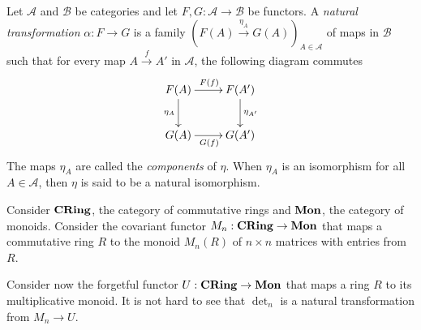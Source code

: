 \begin{definition}
    Let $\mathscr A$ and $\mathscr B$ be categories and let $F, G:\mathscr A\longrightarrow\mathscr B$ be functors. A \textit{natural transformation} $\alpha: F\to G$ is a family $\left(F(A)\stackrel{\eta_A}{\longrightarrow}G(A)\right)_{A\in\mathscr A}$ of maps in $\mathscr B$ such that for every map $A\stackrel{f}{\longrightarrow}A'$ in $\mathscr A$, the following diagram commutes
    \begin{equation*}
        \xymatrix{
            F(A)\ar[r]^{F(f)}\ar[d]_{\eta_A} & F(A')\ar[d]^{\eta_{A'}}\\
            G(A)\ar[r]_{G(f)} & G(A')
        }
    \end{equation*}
    The maps $\eta_A$ are called the \textit{components} of $\eta$. When $\eta_A$ is an isomorphism for all $A\in\mathscr A$, then $\eta$ is said to be a natural isomorphism.
\end{definition}

Consider $\mathbf{CRing}$, the category of commutative rings and $\mathbf{Mon}$, the category of monoids. Consider the covariant functor $M_n:\mathbf{CRing}\to\mathbf{Mon}$ that maps a commutative ring $R$ to the monoid $M_n(R)$ of $n\times n$ matrices with entries from $R$. 

Consider now the forgetful functor $U:\mathbf{CRing}\to\mathbf{Mon}$ that maps a ring $R$ to its multiplicative monoid. It is not hard to see that $\det_n$ is a natural transformation from $M_n\to U$.